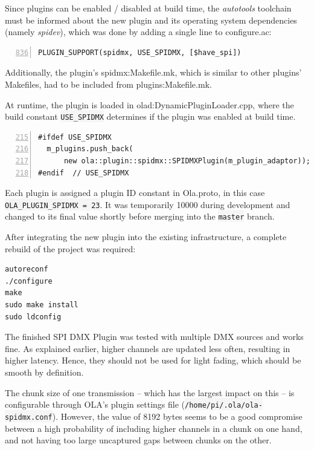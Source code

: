 Since
plugins can be enabled / disabled at build time, the \emph{autotools}
toolchain must be informed about the new plugin and its operating system
dependencies (namely \emph{spidev}), which was done by adding a single
line to \gls{configure.ac}:

\begin{lstlisting}[numbers=left, firstnumber=836, morekeywords={$have_spi}]
PLUGIN_SUPPORT(spidmx, USE_SPIDMX, [$have_spi])
\end{lstlisting}

Additionally,
the plugin's \gls{spidmx:Makefile.mk}, which is similar to other
plugins' Makefiles, had to be included from \gls{plugins:Makefile.mk}.

At runtime, the plugin is loaded in \gls{olad:DynamicPluginLoader.cpp},
where the build constant \colorbox{WhiteSmoke}{\lstinline!USE_SPIDMX!} determines if the plugin
was enabled at build time.

\begin{lstlisting}[numbers=left, style=myCpp, firstnumber=215]
#ifdef USE_SPIDMX
  m_plugins.push_back(
      new ola::plugin::spidmx::SPIDMXPlugin(m_plugin_adaptor));
#endif  // USE_SPIDMX
\end{lstlisting}

Each plugin is assigned a
plugin ID constant in \gls{Ola.proto}, in this case
\colorbox{WhiteSmoke}{\lstinline!OLA_PLUGIN_SPIDMX = 23!}. It was temporarily 10000 during
development and changed to its final value shortly before merging into
the \colorbox{WhiteSmoke}{\lstinline!master!} branch.

After integrating the new plugin into the existing infrastructure, a
complete rebuild of the project was required:

\begin{lstlisting}[style=myBash]
autoreconf
./configure
make
sudo make install
sudo ldconfig
\end{lstlisting}

The finished SPI DMX Plugin was tested with multiple DMX sources and
works fine. As explained earlier, higher channels are updated less
often, resulting in higher latency. Hence, they should not be used for
light fading, which should be smooth by definition.

The chunk size of one transmission -- which has the largest impact on
this -- is configurable through OLA's plugin settings file
(\colorbox{WhiteSmoke}{\lstinline!/home/pi/.ola/ola-spidmx.conf!}). However, the value of 8192
bytes seems to be a good compromise between a high probability of
including higher channels in a chunk on one hand, and not having too
large uncaptured gaps between chunks on the other.

